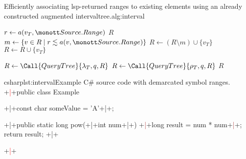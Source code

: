 \documentclass[../thesis]{subfiles}
\begin{document}
\begin{talgorithm}{Efficiently associating \gls{lsp}-returned \glspl{range} to existing elements using an already constructed augmented \gls{intervaltree}.}{alg:interval}
	\begin{algorithm}[H]
		\small
		\tikzexternaldisable
		\begin{algorithmic}[1]
			\State \Return {}
			\EndFunction

			\Statex
			\State $r \gets a(v_T, \tt{Source.Range})$
			\State \Return $R$
			\EndIf
			\State $m \gets \{v \in R \mid r \lesssim a(v, \tt{Source.Range}) \}$
			 
			\State $R \gets (R \setminus m) \cup \{v_T\}$
			 
			\State $R \gets R \cup \{v_T\}$
			\EndIf
			\EndIf

			\State $R \gets \Call{QueryTree}{\lambda_T, q, R}$
			 
			\State $R \gets \Call{QueryTree}{\rho_T, q, R}$
			\EndIf
			\State \Return $R$
			\EndFunction
		\end{algorithmic}
		\tikzexternalenable
	\end{algorithm}
\end{talgorithm}

\begin{codebox}[minted options={linenos,escapeinside=++,firstnumber=0}]{csharp}{lst:interval}{Example C\# source code with demarcated symbol ranges.}
+\textcolor{red}{|}+public class Example {
  +\textcolor{Emerald}{|}+const char someValue = 'A'+\textcolor{Emerald}{|}+;

  +\textcolor{Peach}{|}+public static long pow(+\textcolor{OliveGreen}{|}+int num+\textcolor{OliveGreen}{|}+) {
    +\textcolor{Brown}{|}+long result = num * num+\textcolor{Brown}{|}+;
    return result;
  }+\textcolor{Peach}{|}+
}+\textcolor{red}{|}+
\end{codebox}
\end{document}
